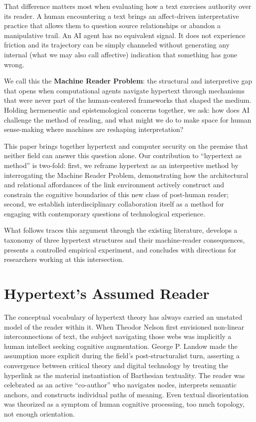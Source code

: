 \documentclass[sigconf,authordraft]{acmart}
\begin{document}
That difference matters most when evaluating how a text exercises authority over its reader. A human encountering a text brings an affect-driven
interpretative practice that allows them to question source relationships or abandon a manipulative trail. An AI agent has no equivalent signal. It does not experience friction and its trajectory can be
simply channeled without generating any internal (what we may also call affective) indication that something has
gone wrong.

We call this the \textbf{Machine Reader Problem}: the structural and interpretive
gap that opens when computational agents navigate hypertext through mechanisms
that were never part of the human-centered frameworks that shaped the medium.
Holding hermeneutic and
epistemological concerns together, we ask: how does AI challenge the method of
reading, and what might we do to make space for human sense-making where machines
are reshaping interpretation?

This paper brings together hypertext and computer security on the premise
that neither field can answer this question alone. Our contribution to ``hypertext as method'' is two-fold:
first, we reframe hypertext as an interpretive method by interrogating the
Machine Reader Problem, demonstrating how the architectural and relational
affordances of the link environment actively construct and constrain the
cognitive boundaries of this new class of post-human reader; second, we
establish interdisciplinary collaboration itself as a method for engaging with
contemporary questions of technological experience.


What follows traces this argument through the existing literature, develops a
taxonomy of three hypertext structures and their machine-reader
consequences, presents a controlled empirical experiment, and concludes with
directions for researchers working at this intersection.
\section{Hypertext's Assumed Reader}

The conceptual vocabulary of hypertext theory has always carried an unstated
model of the reader within it. When Theodor Nelson first envisioned non-linear
interconnections of text, the subject navigating those webs was implicitly a
human intellect seeking cognitive augmentation. George P. Landow
\cite{landow2006hypertext} made the assumption more explicit during the
field's post-structuralist turn, asserting a convergence between critical theory
and digital technology by treating the hyperlink as the material instantiation of
Barthesian textuality. The reader was celebrated as an active ``co-author'' who
navigates nodes, interprets semantic anchors, and constructs individual paths of
meaning. Even textual disorientation was theorized as a symptom of human
cognitive processing, too much topology, not enough orientation.
\end{document}
